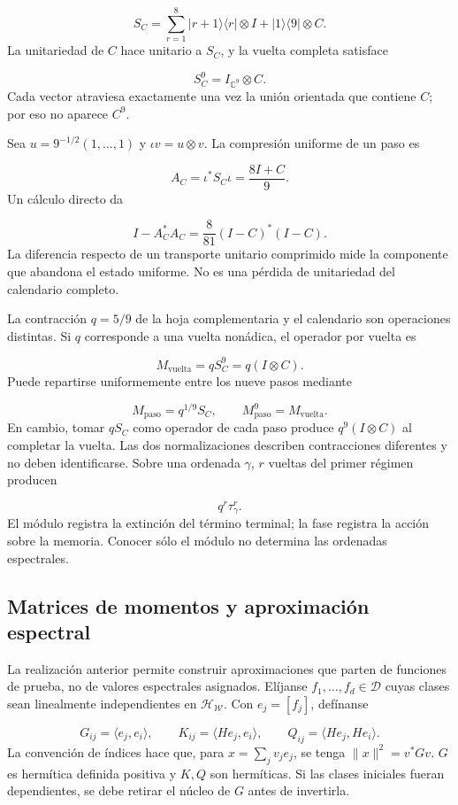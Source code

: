 \[
S_C=\sum_{r=1}^{8}|r+1\rangle\langle r|\otimes I
+|1\rangle\langle9|\otimes C.
\]
La unitariedad de \(C\) hace unitario a \(S_C\), y la vuelta completa satisface

\[
S_C^9=I_{\mathbb C^9}\otimes C.
\]
Cada vector atraviesa exactamente una vez la unión orientada que contiene \(C\); por eso no aparece \(C^9\).

Sea \(u=9^{-1/2}(1,\ldots,1)\) y \(\iota v=u\otimes v\). La compresión uniforme de un paso es

\[
A_C=\iota^*S_C\iota=\frac{8I+C}{9}.
\]
Un cálculo directo da

\[
I-A_C^*A_C
=\frac8{81}(I-C)^*(I-C).
\]
La diferencia respecto de un transporte unitario comprimido mide la componente que abandona el estado uniforme. No es una pérdida de unitariedad del calendario completo.

La contracción \(q=5/9\) de la hoja complementaria y el calendario son operaciones distintas. Si \(q\) corresponde a una vuelta nonádica, el operador por vuelta es

\[
M_{\mathrm{vuelta}}=qS_C^9
=q(I\otimes C).
\]
Puede repartirse uniformemente entre los nueve pasos mediante

\[
M_{\mathrm{paso}}=q^{1/9}S_C,\qquad
M_{\mathrm{paso}}^9=M_{\mathrm{vuelta}}.
\]
En cambio, tomar \(qS_C\) como operador de cada paso produce \(q^9(I\otimes C)\) al completar la vuelta. Las dos normalizaciones describen contracciones diferentes y no deben identificarse. Sobre una ordenada \(\gamma\), \(r\) vueltas del primer régimen producen

\[
q^r\tau_\gamma^r.
\]
El módulo registra la extinción del término terminal; la fase registra la acción sobre la memoria. Conocer sólo el módulo no determina las ordenadas espectrales.

\subsection{Matrices de momentos y aproximación espectral}
La realización anterior permite construir aproximaciones que parten de funciones de prueba, no de valores espectrales asignados. Elíjanse \(f_1,\ldots,f_d\in\mathcal D\) cuyas clases sean linealmente independientes en \(\mathcal H_{\mathscr W}\). Con \(e_j=[f_j]\), defínanse

\[
G_{ij}=\langle e_j,e_i\rangle,\qquad
K_{ij}=\langle He_j,e_i\rangle,\qquad
Q_{ij}=\langle He_j,He_i\rangle.
\]
La convención de índices hace que, para \(x=\sum_jv_je_j\), se tenga \(\|x\|^2=v^*Gv\). \(G\) es hermítica definida positiva y \(K,Q\) son hermíticas. Si las clases iniciales fueran dependientes, se debe retirar el núcleo de \(G\) antes de invertirla.

